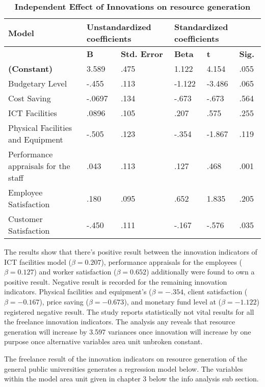 \begin{table}[ht]
    \centering
\begin{tabular}{|l|l|l|l|l|l|}
   \hline
   \textbf{Model} & \multicolumn{2}{|l|}{\textbf{Unstandardized coefficients}} & \multicolumn{3}{|l|}{\textbf{Standardized coefficients}}\\ \hline
   & \textbf{B} & \textbf{Std. Error} & \textbf{Beta} & \textbf{t} & \textbf{Sig.}\\ \hline
   \textbf{(Constant)} & 3.589 & .475 & 1.122 & 4.154 & .055\\ \hline
   Budgetary Level & -.455 & .113 & -1.122 & -3.486 & .065\\ \hline
   Cost Saving & -.0697 & .134 & -.673 & -.673 & .564\\ \hline
   ICT Facilities & .0896 & .105 & .207 & .575 & .255\\ \hline
   Physical Facilities and Equipment & -.505 & .123 & -.354 & -1.867 & .119\\ \hline
   Performance appraisals for the staff & .043 & .113 & .127 & .468 & .001\\ \hline
   Employee Satisfaction & .180 & .095 & .652 & 1.835 & .205\\ \hline
   Customer Satisfaction & -.450 & .111 & -.167 & -.576 & .035\\ \hline
\end{tabular}
    \caption{\textbf{Independent Effect of Innovations on resource generation}}
\end{table}

The results show that there's positive result between the innovation indicators of ICT facilities model ($\beta = 0.207$), performance appraisals for the employees ($\beta = 0.127$) and worker satisfaction ($\beta = 0.652$) additionally were found to own a positive result. Negative result is recorded for the remaining innovation indicators. Physical facilities and equipment’s ($\beta = -.354$, client satisfaction ($\beta = -0.167$), price saving ($\beta = -0.673$), and monetary fund level at ($\beta = -1.122$) registered negative result. The study reports statistically not vital results for all the freelance innovation indicators. The analysis any reveals that resource generation will increase by 3.597 variances once innovation will increase by one purpose once alternative variables area unit unbroken constant.

The freelance result of the innovation indicators on resource generation of the general public universities generates a regression model below. The variables within the model area unit given in chapter 3 below the info analysis sub section.

